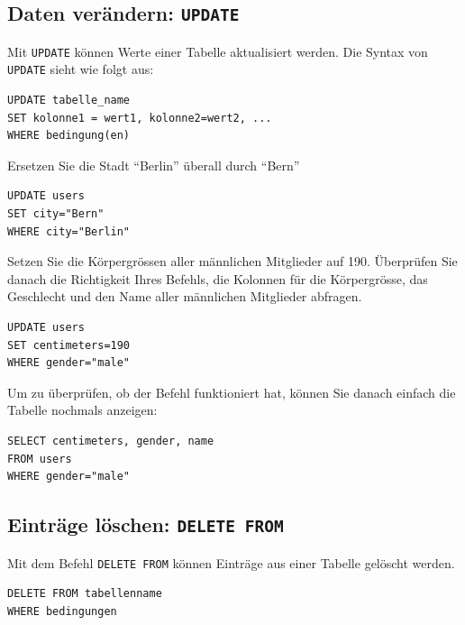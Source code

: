 \subsection{Daten verändern: \texorpdfstring{\lstinline|UPDATE|}{UPDATE}}

Mit \lstinline|UPDATE| können Werte einer Tabelle aktualisiert werden. Die Syntax von \lstinline|UPDATE| sieht wie folgt aus:

\begin{lstlisting}
UPDATE tabelle_name
SET kolonne1 = wert1, kolonne2=wert2, ...
WHERE bedingung(en)
\end{lstlisting}

\begin{myexercise}\label{aufgabe:evalPoly}

  Ersetzen Sie die Stadt \enquote{Berlin} überall durch \enquote{Bern}
  \begin{myanswer}
    \begin{lstlisting}
UPDATE users
SET city="Bern"
WHERE city="Berlin"
\end{lstlisting}
  \end{myanswer}
\end{myexercise}

\begin{myexercise}
  Setzen Sie die Körpergrössen aller männlichen Mitglieder auf 190. Überprüfen Sie danach die Richtigkeit Ihres Befehls, die Kolonnen für die Körpergrösse, das Geschlecht und den Name aller männlichen Mitglieder abfragen.
  \begin{myanswer}
    \begin{lstlisting}
UPDATE users
SET centimeters=190
WHERE gender="male"
\end{lstlisting}
Um zu überprüfen, ob der Befehl funktioniert hat, können Sie danach einfach die Tabelle nochmals anzeigen:
\begin{lstlisting}
SELECT centimeters, gender, name
FROM users
WHERE gender="male"
\end{lstlisting}

  \end{myanswer}
\end{myexercise}

\subsection{Einträge löschen: \texorpdfstring{\lstinline|DELETE FROM|}{DELETE FROM}}
Mit dem Befehl \lstinline|DELETE FROM| können Einträge aus einer Tabelle gelöscht werden.
\begin{lstlisting}
DELETE FROM tabellenname
WHERE bedingungen
\end{lstlisting}

